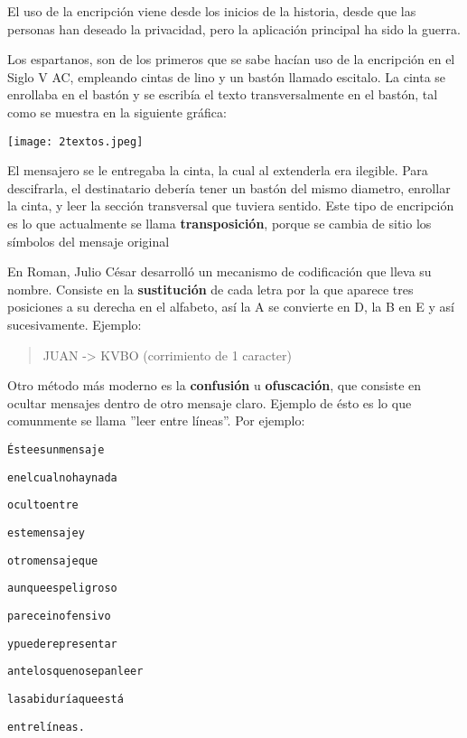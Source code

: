 El uso de la encripción viene desde los inicios de la historia, desde
que las personas han deseado la privacidad, pero la aplicación
principal ha sido la guerra.

Los espartanos, son de los primeros que se sabe hacían uso de la
encripción en el Siglo V AC, empleando cintas de lino y un bastón
llamado escitalo. La cinta se enrollaba en el bastón y se escribía el
texto transversalmente en el bastón, tal como se muestra en la
siguiente gráfica:

\begin{center}
  \texttt{[image: 2textos.jpeg]}
\end{center}

El mensajero se le entregaba la cinta, la cual al extenderla era
ilegible.  Para descifrarla, el destinatario debería tener un bastón
del mismo diametro, enrollar la cinta, y leer la sección transversal
que tuviera sentido.  Este tipo de encripción es lo que actualmente se
llama \textbf{transposición}, porque se cambia de sitio los símbolos
del mensaje original

En Roman, Julio César desarrolló un mecanismo de codificación que
lleva su nombre.  Consiste en la \textbf{sustitución} de cada letra
por la que aparece tres posiciones a su derecha en el alfabeto, así la
A se convierte en D, la B en E y así sucesivamente.  Ejemplo:

\begin{quote}
  JUAN -> KVBO (corrimiento de 1 caracter)
\end{quote}

Otro método más moderno es la \textbf{confusión} u
\textbf{ofuscación}, que consiste en ocultar mensajes dentro de otro
mensaje claro.  Ejemplo de ésto es lo que comunmente se llama ''leer
entre líneas''.  Por ejemplo:

\begin{alltt}
  Éste es un mensaje

  en el cual no hay nada

  oculto entre

  este mensaje y

  otro mensaje que

  aunque es peligroso

  parece inofensivo

  y puede representar

  ante los que no sepan leer

  la sabiduría que está

  entre líneas.
\end{alltt}

